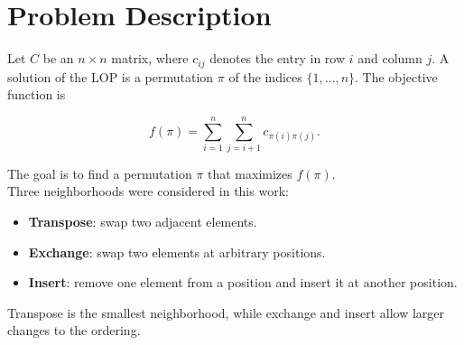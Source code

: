 \section{Problem Description}\label{sec:related}


Let \(C\) be an \(n \times n\) matrix, where \(c_{ij}\) denotes the entry in row \(i\) and column \(j\). A solution of the LOP is a permutation \(\pi\) of the indices \(\{1,\dots,n\}\). The objective function is

\[
f(\pi) = \sum_{i=1}^{n} \sum_{j=i+1}^{n} c_{\pi(i)\pi(j)}.
\]

The goal is to find a permutation \(\pi\) that maximizes \(f(\pi)\).
\\
Three neighborhoods were considered in this work:
\begin{itemize}[leftmargin=1.5em]
    \item \textbf{Transpose}: swap two adjacent elements.
    \item \textbf{Exchange}: swap two elements at arbitrary positions.
    \item \textbf{Insert}: remove one element from a position and insert it at another position.
\end{itemize}

Transpose is the smallest neighborhood, while exchange and insert allow larger changes to the ordering.
